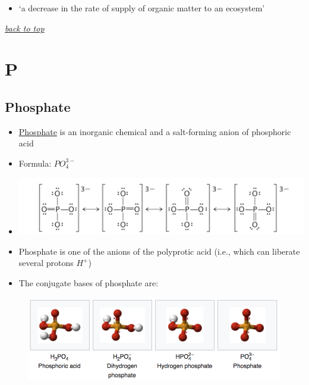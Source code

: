 \documentclass[]{book}
\providecommand{\tightlist}{%
  \setlength{\itemsep}{0pt}\setlength{\parskip}{0pt}}
\theoremstyle{definition}
\theoremstyle{definition}
\theoremstyle{definition}
\theoremstyle{remark}
\begin{document}
\begin{itemize}
\tightlist
\item
  `a decrease in the rate of supply of organic matter to an ecosystem'
  \citep{Nixon2009-ft}
\end{itemize}

\emph{\protect\hyperlink{top}{back to top}}

\section{P}\label{p}

\subsection{Phosphate}\label{phosphate}

\begin{itemize}
\tightlist
\item
  \href{https://en.wikipedia.org/wiki/Phosphate}{Phosphate} is an
  inorganic chemical and a salt-forming anion of phosphoric acid
\item
  Formula: \(PO_4^{3-}\)
\item
  \includegraphics{pictures/phosphate_lewis_structure.jpg}
\item
  Phosphate is one of the anions of the polyprotic acid (i.e., which can
  liberate several protons \(H^{+}\))
\item
  The conjugate bases of phosphate are:
\end{itemize}

\begin{figure}
\centering
\includegraphics[width=1.00000\textwidth]{pictures/phosphate_conjugate_bases.png}
\caption{}
\end{figure}
\end{document}
